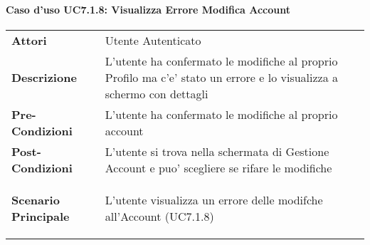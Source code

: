 \paragraph{Caso d'uso UC7.1.8:  Visualizza Errore Modifica Account}
\label{UC7_1_8}

\begin{tabular}{ l | p{11cm}}
	\hline
	\rowcolor{Gray}
	 \multicolumn{2}{c}{UC7.1.8 - Visualizza Errore Eliminazione Account} \\
	 \hline
	\textbf{Attori} & Utente Autenticato \\
	\textbf{Descrizione} & L'utente ha confermato le modifiche al proprio Profilo ma c'e' stato un errore e lo visualizza a schermo con dettagli\\
	\textbf{Pre-Condizioni} & L'utente ha confermato le modifiche al proprio account\\
	\textbf{Post-Condizioni} & L'utente si trova nella schermata di Gestione Account e puo' scegliere se rifare le modifiche \\
	\textbf{Scenario Principale} & 
	\begin{enumerate*}[label=(\arabic*.),itemjoin={\newline}]
		\item L'utente visualizza un errore delle modifche all'Account (UC7.1.8)
	\end{enumerate*}\\
\end{tabular}